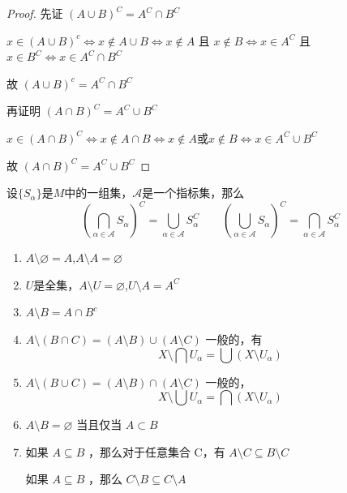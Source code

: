 \begin{proof}
	先证 $(A \cup B)^C=A^C \cap B^C$
	
	$x \in(A \cup B)^c \Leftrightarrow x \notin A \cup B \Leftrightarrow x \notin A$ 且 $x \notin B \Leftrightarrow x \in A^C$ 且 $x \in B^C \Leftrightarrow x \in A^C \cap B^C$
	
	
	故 $(A \cup B)^c=A^C \cap B^C$
	
	
	
	再证明 $(A \cap B)^C=A^C\cup B^C$
	
	$ x \in(A \cap B)^C \Leftrightarrow x \notin A \cap B \Leftrightarrow x \notin A\text{或}x \notin B \Leftrightarrow x \in A^C\cup B^C$
	
	故 $(A \cap B)^C=A^C \cup B^C$
\end{proof}
\begin{corollary}
	设$\{S_{\alpha}\}$是$M$中的一组集，$\mathcal{A}$是一个指标集，那么
	\[ (\bigcap_{\alpha\in\mathcal{A}}S_{\alpha})^{C}=\bigcup_{\alpha\in\mathcal{A}}S_{\alpha}^{C}\qquad(\bigcup_{\alpha\in\mathcal{A}}S_{\alpha})^{C}=\bigcap_{\alpha\in\mathcal{A}}S_{\alpha}^{C} \]
\end{corollary}
\begin{proposition}
	\begin{enumerate}
		\item $A\setminus\varnothing=A$,$A\setminus  A=\varnothing$
		
		\item$U$是全集，$A\setminus  U=\varnothing$,$U\setminus  A=A^C$
		\item$A\setminus  B=A \cap B^c$
		\item$
		A\setminus  (B \cap C)=(A\setminus  B) \cup(A\setminus  C)
		$
		一般的，有$$X\setminus  \bigcap U_{\alpha}=\bigcup(X\setminus  U_{\alpha})$$
		
		\item$A\setminus  (B \cup C)=(A\setminus  B) \cap(A\setminus  C)$
		一般的，$$X\setminus  \bigcup U_{\alpha}=\bigcap(X\setminus  U_{\alpha})$$
		
		
		\item$A\setminus  B=\varnothing$ 当且仅当 $A \subset B$
		\item 如果 $A \subseteq B$ ，那么对于任意集合 C，有 $A\setminus  C \subseteq B\setminus  C$
		
		如果 $A \subseteq B$ ，那么 $C\setminus  B \subseteq C\setminus  A$
		
	\end{enumerate}
\end{proposition}
